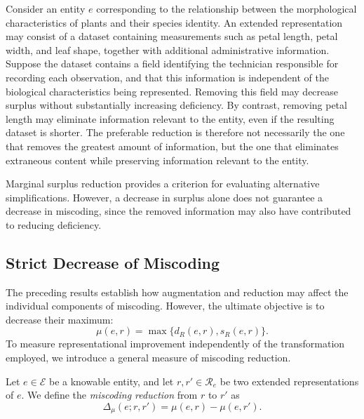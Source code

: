 \begin{example}
Consider an entity $e$ corresponding to the relationship between the morphological characteristics of plants and their species identity. An extended representation may consist of a dataset containing measurements such as petal length, petal width, and leaf shape, together with additional administrative information. Suppose the dataset contains a field identifying the technician responsible for recording each observation, and that this information is independent of the biological characteristics being represented. Removing this field may decrease surplus without substantially increasing deficiency. By contrast, removing petal length may eliminate information relevant to the entity, even if the resulting dataset is shorter. The preferable reduction is therefore not necessarily the one that removes the greatest amount of information, but the one that eliminates extraneous content while preserving information relevant to the entity.
\end{example}

Marginal surplus reduction provides a criterion for evaluating alternative simplifications. However, a decrease in surplus alone does not guarantee a decrease in miscoding, since the removed information may also have contributed to reducing deficiency.


\subsection*{Strict Decrease of Miscoding}

The preceding results establish how augmentation and reduction may affect the individual components of miscoding. However, the ultimate objective is to decrease their maximum:
\[
\mu(e,r) = \max\{d_R(e,r),s_R(e,r)\}.
\]
To measure representational improvement independently of the transformation employed, we introduce a general measure of miscoding reduction.

\begin{definition}
\label{def:miscoding_reduction}
Let $e\in\mathcal E$ be a knowable entity, and let $r,r'\in\mathcal R_e$ be two extended representations of $e$. We define the \emph{miscoding reduction} from $r$ to $r'$ as
\[
\Delta_\mu(e;r,r') = \mu(e,r) - \mu(e,r').
\]
\end{definition}

